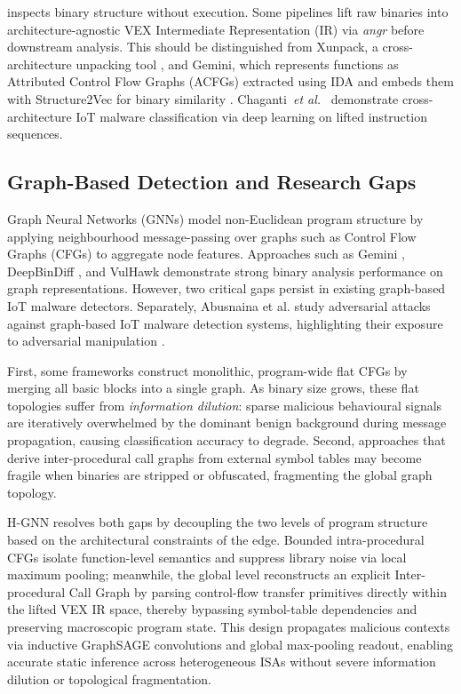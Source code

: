 \documentclass{llncs}
\begin{document}
 inspects binary structure without
execution. Some pipelines lift raw binaries into architecture-agnostic
VEX Intermediate Representation (IR) via \textit{angr} before downstream
analysis.
This should be distinguished from Xunpack, a cross-architecture
unpacking tool \cite{b4}, and Gemini, which represents functions as
Attributed Control Flow Graphs (ACFGs) extracted using IDA and embeds them
with Structure2Vec for binary similarity \cite{b8}.
Chaganti~\textit{et al.}~\cite{b5} demonstrate cross-architecture
IoT malware classification via deep learning on lifted instruction
sequences.

\subsection{Graph-Based Detection and Research Gaps}

Graph Neural Networks (GNNs) model non-Euclidean program
structure by applying neighbourhood message-passing over graphs such as
Control Flow Graphs (CFGs) to aggregate node features.
Approaches such as Gemini \cite{b8}, DeepBinDiff \cite{b9}, and VulHawk
\cite{b10} demonstrate strong binary analysis performance on
graph representations. However, two critical gaps persist
in existing graph-based IoT malware detectors.
Separately, Abusnaina et al. study adversarial attacks against
graph-based IoT malware detection systems, highlighting their exposure to
adversarial manipulation \cite{b6}.

First, some frameworks construct monolithic, program-wide
flat CFGs by merging all basic blocks into a single graph.
As binary size grows, these flat topologies suffer
from \textit{information dilution}: sparse malicious
behavioural signals are iteratively overwhelmed by the
dominant benign background during message propagation, causing
classification accuracy to degrade. Second, approaches that derive
inter-procedural call graphs from external symbol tables may become fragile
when binaries are stripped or obfuscated, fragmenting the global graph
topology.

H-GNN resolves both gaps by decoupling the two levels of program structure based 
on the architectural constraints of the edge. Bounded intra-procedural CFGs isolate 
function-level semantics and suppress library noise via local maximum pooling; 
meanwhile, the global level reconstructs an explicit Inter-procedural Call Graph 
by parsing control-flow transfer primitives directly within the lifted VEX IR space, 
thereby bypassing symbol-table dependencies and preserving macroscopic program state. 
This design propagates malicious contexts via inductive GraphSAGE convolutions and 
global max-pooling readout, enabling accurate static inference 
across heterogeneous ISAs without severe information dilution or topological fragmentation.
\end{document}
